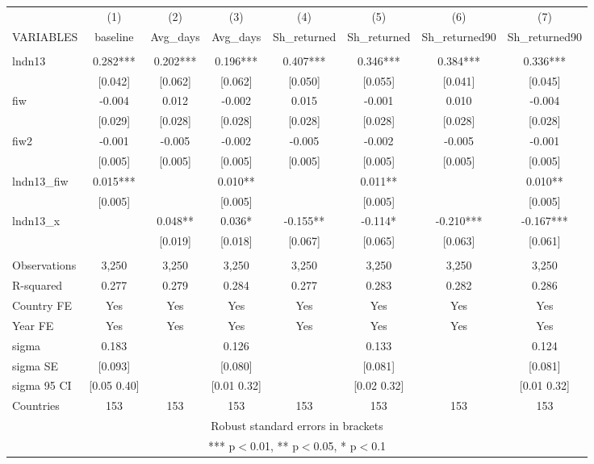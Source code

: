 \begin{tabular}{lccccccc} \hline
 & (1) & (2) & (3) & (4) & (5) & (6) & (7) \\
VARIABLES & baseline & Avg\_days & Avg\_days & Sh\_returned & Sh\_returned & Sh\_returned90 & Sh\_returned90 \\ \hline
 &  &  &  &  &  &  &  \\
lndn13 & 0.282*** & 0.202*** & 0.196*** & 0.407*** & 0.346*** & 0.384*** & 0.336*** \\
 & [0.042] & [0.062] & [0.062] & [0.050] & [0.055] & [0.041] & [0.045] \\
fiw & -0.004 & 0.012 & -0.002 & 0.015 & -0.001 & 0.010 & -0.004 \\
 & [0.029] & [0.028] & [0.028] & [0.028] & [0.028] & [0.028] & [0.028] \\
fiw2 & -0.001 & -0.005 & -0.002 & -0.005 & -0.002 & -0.005 & -0.001 \\
 & [0.005] & [0.005] & [0.005] & [0.005] & [0.005] & [0.005] & [0.005] \\
lndn13\_fiw & 0.015*** &  & 0.010** &  & 0.011** &  & 0.010** \\
 & [0.005] &  & [0.005] &  & [0.005] &  & [0.005] \\
lndn13\_x &  & 0.048** & 0.036* & -0.155** & -0.114* & -0.210*** & -0.167*** \\
 &  & [0.019] & [0.018] & [0.067] & [0.065] & [0.063] & [0.061] \\
 &  &  &  &  &  &  &  \\
Observations & 3,250 & 3,250 & 3,250 & 3,250 & 3,250 & 3,250 & 3,250 \\
R-squared & 0.277 & 0.279 & 0.284 & 0.277 & 0.283 & 0.282 & 0.286 \\
Country FE & Yes & Yes & Yes & Yes & Yes & Yes & Yes \\
Year FE & Yes & Yes & Yes & Yes & Yes & Yes & Yes \\
sigma & 0.183 &  & 0.126 &  & 0.133 &  & 0.124 \\
sigma SE & [0.093] &  & [0.080] &  & [0.081] &  & [0.081] \\
sigma 95 CI & [0.05 0.40] &  & [0.01 0.32] &  & [0.02 0.32] &  & [0.01 0.32] \\
 Countries & 153 & 153 & 153 & 153 & 153 & 153 & 153 \\ \hline
\multicolumn{8}{c}{ Robust standard errors in brackets} \\
\multicolumn{8}{c}{ *** p$<$0.01, ** p$<$0.05, * p$<$0.1} \\
\end{tabular}
